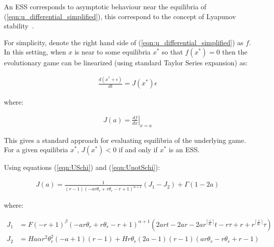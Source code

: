 \documentclass[10pt]{article}
\begin{document}
An ESS corresponds to asymptotic behaviour near the equilibria of
(\ref{eqn:u_differential_simplified}), this correspond to the concept of
Lyapunov stability~\cite{lyapunov1992general}.

For simplicity, denote the right hand side of
(\ref{eqn:u_differential_simplified}) as \(f\).
In this setting, when \(x\) is near to some equilibria \(x^*\) so that
\(f(x^*)=0\) then the evolutionary game can be linearized (using standard Taylor
Series expansion) as:

\begin{equation}
    \begin{split}
    \frac{d(x^* + \epsilon)}{dt} = J(x^*)\epsilon
    \end{split}
\end{equation}


where:

\begin{equation}
    \begin{split}
    J(a) = \left.\frac{df}{dx}\right|_{x=a}
    \end{split}
\end{equation}


This gives a standard approach for evaluating equilibria of the underlying game.
For a given equilibria \(x^*\), \(J(x^*)<0\) if and only if \(x^*\) is an ESS\@.

Using equations (\ref{eqn:USchi}) and (\ref{eqn:UnotSchi}):

\begin{equation}
    \begin{split}
    J(a) = \frac{1}{\left(r - 1\right) \left(- a r \theta_{r} + r \theta_{r} - r
+ 1\right)^{\alpha + 1}} \left(J_1 - J_2 \right) + \Gamma(1 - 2a)
    \end{split}
\end{equation}


where:

\begin{equation*}
    \begin{split}
    J_1 & = F \left(- r + 1\right)^{\beta} \left(- a r \theta_{r} + r \theta_{r}
    - r + 1\right)^{\alpha + 1} \left(2 a r t - 2 a r - 2 a
r^{\lceil{\frac{1}{\theta_{r}}}\rceil} t - r \tau + r +
r^{\lceil{\frac{1}{\theta_{r}}}\rceil} \tau\right)\\
    J_2 & = H a \alpha r^{2} \theta_{r}^{2} \left(- a + 1\right) \left(r - 1\right) + H r \theta_{r} \left(2 a - 1\right) \left(r - 1\right) \left(a r \theta_{r} - r \theta_{r} + r - 1\right)
    \end{split}
\end{equation*}
\end{document}
